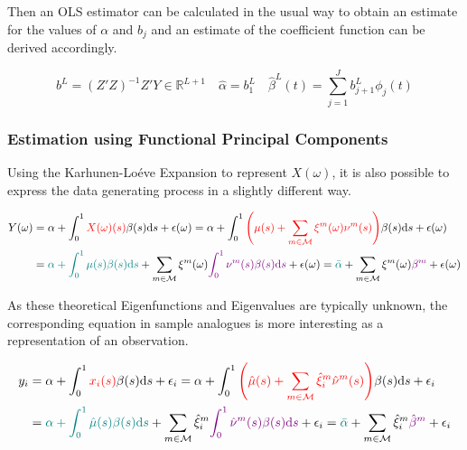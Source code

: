 \documentclass[11pt,twoside,a4paper]{article}
\begin{document}
	Then an OLS estimator can be calculated in the usual way to obtain an estimate for the values of $\alpha$ and $b_j$ and an estimate of the coefficient function can be derived accordingly.
	
	\begin{equation}
		b^L = \left(Z'Z\right)^{-1}Z'Y \in \mathbb{R}^{L+1} \quad \hat{\alpha} = b_{1}^{L} \quad \hat{\beta}^L(t) = \sum_{j = 1}^{J} b_{j+1}^L \phi_j(t)
	\end{equation}
	
	\subsubsection{Estimation using Functional Principal Components}
	
	Using the Karhunen-Lo\'{e}ve Expansion to represent $X(\omega)$, it is also possible to express the data generating process in a slightly different way.
	
	\begin{equation}
		\begin{split}
			Y(\omega) &= \alpha + \int_{0}^{1} {\color{red}X(\omega)(s)} \beta(s) \mathrm{d}s + \epsilon(\omega)
			= \alpha + \int_{0}^{1} {\color{red}\left(\mu(s) + \sum_{m \in \mathcal{M}} \xi^m(\omega) \nu^m(s)\right)} \beta(s) \mathrm{d}s + \epsilon(\omega)\\
			&= {\color{teal}\alpha + \int_{0}^{1} \mu(s) \beta(s) \mathrm{d}s} + \sum_{m \in \mathcal{M}} \xi^m(\omega) {\color{violet}\int_{0}^{1} \nu^m(s) \beta(s) \mathrm{d}s} + \epsilon(\omega)
			= {\color{teal}\bar{\alpha}} + \sum_{m \in \mathcal{M}} \xi^m(\omega) {\color{violet}\beta^m} + \epsilon(\omega)
		\end{split}
	\end{equation}

	As these theoretical Eigenfunctions and Eigenvalues are typically unknown, the corresponding equation in sample analogues is more interesting as a representation of an observation.
	
	\begin{equation}
		\begin{split}
			y_i &= \alpha + \int_{0}^{1} {\color{red}x_i(s)} \beta(s) \mathrm{d}s + \epsilon_i
			= \alpha + \int_{0}^{1} {\color{red}\left(\hat{\mu}(s) + \sum_{m \in \mathcal{M}} \hat{\xi}^m_i \hat{\nu}^m(s)\right)} \beta(s) \mathrm{d}s + \epsilon_i\\
			&= {\color{teal}\alpha + \int_{0}^{1} \hat{\mu}(s) \beta(s) \mathrm{d}s} + \sum_{m \in \mathcal{M}} \hat{\xi}^m_i {\color{violet}\int_{0}^{1} \hat{\nu}^m(s) \beta(s) \mathrm{d}s} + \epsilon_i
			= {\color{teal}\bar{\alpha}} + \sum_{m \in \mathcal{M}} \hat{\xi}^m_i {\color{violet}\hat{\beta}^m} + \epsilon_i
		\end{split}
	\end{equation}
	
\end{document}

